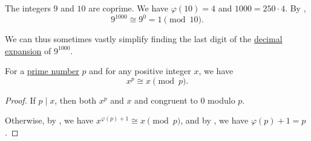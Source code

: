 \begin{example}\label{ex:thm:division_modulo}
  The integers \( 9 \) and \( 10 \) are coprime. We have \( \varphi(10) = 4 \) and \( 1000 = 250 \cdot 4 \). By ,
  \begin{equation*}
    9^{1000} \cong 9^0 = 1 \pmod {10}.
  \end{equation*}

  We can thus sometimes vastly simplify finding the last digit of the \hyperref[def:positional_number_system/decimal]{decimal expansion} of \( 9^{1000} \).
\end{example}

\begin{theorem}\label{thm:fermats_little_theorem}
  For a \hyperref[def:prime_number]{prime number} \( p \) and for any positive integer \( x \), we have
  \begin{equation*}
    x^p \cong x \pmod p.
  \end{equation*}
\end{theorem}
\begin{proof}
  If \( p \mid x \), then both \( x^p \) and \( x \) and congruent to \( 0 \) modulo \( p \).

  Otherwise, by , we have \( x^{\varphi(p) + 1} \cong x \pmod p \), and by , we have \( \varphi(p) + 1 = p \).
\end{proof}
